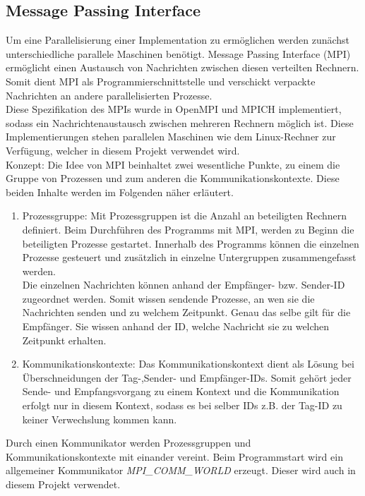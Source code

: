 \subsection{Message Passing Interface}
Um eine Parallelisierung einer Implementation zu ermöglichen werden zunächst unterschiedliche parallele Maschinen benötigt.
Message Passing Interface (MPI) ermöglicht einen Austausch von Nachrichten zwischen diesen verteilten Rechnern. Somit dient MPI als Programmierschnittstelle und verschickt verpackte Nachrichten an andere parallelisierten Prozesse.\\
Diese Spezifikation des MPIs wurde in OpenMPI und MPICH implementiert, sodass ein Nachrichtenaustausch zwischen mehreren Rechnern möglich ist. 
Diese Implementierungen stehen parallelen Maschinen wie dem Linux-Rechner zur Verfügung, welcher in diesem Projekt verwendet wird.\\ 
Konzept: Die Idee von MPI beinhaltet zwei wesentliche Punkte, zu einem die Gruppe von Prozessen und zum anderen die Kommunikationskontexte. Diese beiden Inhalte werden im Folgenden näher erläutert.
\begin{enumerate}
	\item Prozessgruppe: Mit Prozessgruppen ist die Anzahl an beteiligten Rechnern definiert. Beim Durchführen des Programms mit MPI, werden zu Beginn die beteiligten Prozesse gestartet. Innerhalb des Programms können die einzelnen Prozesse gesteuert und zusätzlich in einzelne Untergruppen zusammengefasst werden. \\
	Die einzelnen Nachrichten können anhand der Empfänger- bzw. Sender-ID zugeordnet werden. Somit wissen sendende Prozesse, an wen sie die Nachrichten senden und zu welchem Zeitpunkt. Genau das selbe gilt für die Empfänger. Sie wissen anhand der ID, welche Nachricht sie zu welchen Zeitpunkt erhalten.\\
	
	\item Kommunikationskontexte: Das Kommunikationskontext dient als Lösung bei Überschneidungen der Tag-,Sender- und Empfänger-IDs. Somit gehört jeder Sende- und Empfangsvorgang zu einem Kontext und die Kommunikation erfolgt nur in diesem Kontext, sodass es bei selber IDs z.B. der Tag-ID zu keiner Verwechslung kommen kann. 
\end{enumerate}
Durch einen Kommunikator werden Prozessgruppen und Kommunikationskontexte mit einander vereint. Beim Programmstart wird ein allgemeiner Kommunikator \textit{MPI\_COMM\_WORLD} erzeugt. Dieser wird auch in diesem Projekt verwendet.\\
